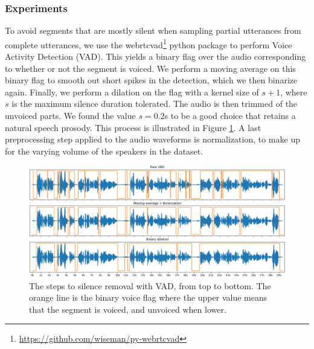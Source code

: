 \documentclass[a4paper, oneside, 12pt, english]{article}
\begin{document}
\subsubsection{Experiments}
To avoid segments that are mostly silent when sampling partial utterances from complete utterances, we use the webrtcvad\footnote{\url{https://github.com/wiseman/py-webrtcvad}} python package to perform Voice Activity Detection (VAD). This yields a binary flag over the audio corresponding to whether or not the segment is voiced. We perform a moving average on this binary flag to smooth out short spikes in the detection, which we then binarize again. Finally, we perform a dilation on the flag with a kernel size of $s + 1$, where $s$ is the maximum silence duration tolerated. The audio is then trimmed of the unvoiced parts. We found the value $s=0.2$s to be a good choice that retains a natural speech prosody. This process is illustrated in Figure \ref{encoder_preprocess_vad}. A last preprocessing step applied to the audio waveforms is normalization, to make up for the varying volume of the speakers in the dataset.

\begin{figure}[h]
	\centering
	\includegraphics[width=0.95\linewidth]{images/encoder_preprocess_vad.png}
	\caption{The steps to silence removal with VAD, from top to bottom. The orange line is the binary voice flag where the upper value means that the segment is voiced, and unvoiced when lower.}
	\label{encoder_preprocess_vad}
\end{figure}
\end{document}
